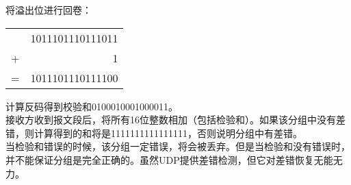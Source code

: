 将溢出位进行回卷：

\begin{table}[H]
	\centering
	\begin{tabular}{cD{.}{.}{3}}
		  & 1011101110111011 \\
		+ & 1                 \\
		\hline
		= & 1011101110111100
	\end{tabular}
\end{table}

计算反码得到校验和0100010001000011。\\

接收方收到报文段后，将所有16位整数相加（包括检验和）。如果该分组中没有差错，则计算得到的和将是1111111111111111，否则说明分组中有差错。\\

当检验和错误的时候，该分组一定错误，将会被丢弃。但是当检验和没有错误时，并不能保证分组是完全正确的。虽然UDP提供差错检测，但它对差错恢复无能无力。

\newpage